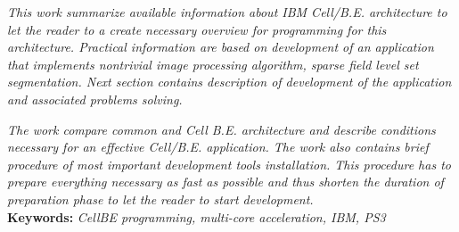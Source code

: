 \par
\noindent
\textit{
This work summarize available information about IBM \mbox{Cell/B.E.} architecture to let the reader to a create necessary overview for programming for this architecture.
Practical information are based on development of an application that implements nontrivial image processing algorithm, sparse field level set segmentation.
Next section contains description of development of the application and associated problems solving.
}\\
\par
\noindent
\textit{
The work compare common and Cell B.E. architecture and describe conditions necessary for an effective \mbox{Cell/B.E.} application.
The work also contains brief procedure of most important development tools installation.
This procedure has to prepare everything necessary as fast as possible and thus shorten the duration of preparation phase to let the reader to start development.
}\\

\noindent
\textbf{Keywords:} \textit{CellBE programming, multi-core acceleration, IBM, PS3}

\pagebreak